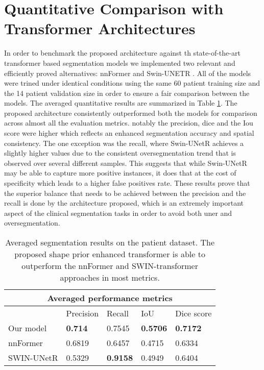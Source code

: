 \section{Quantitative Comparison with Transformer Architectures}
In order to benchmark the proposed architecture against th state-of-the-art transformer based segmentation models we implemented two relevant and efficiently proved alternatives: nnFormer \cite{zhou2023nnformer} and Swin-UNETR \cite{10.1007/978-3-031-08999-2_22}. All of the models were trined under identical conditions using the same 60 patient training size and the 14 patient validation size in order to ensure a fair comparison between the models. The averaged quantitative results are summarized in Table \ref{tab:quantitative_comparison}. The proposed architecture consistently outperformed both the models for comparison across almost all the evaluation metrics. notably the precision, dice and the Iou score were higher which reflects an enhanced segmentation accuracy and spatial consistency. The one exception was the recall, where Swin-UNetR achieves a slightly higher values due to the consistent oversegmentation trend that is observed over several different samples. This suggests that while Swin-UNetR may be able to capture more positive instances, it does that at the cost of specificity which leads to a higher false positives rate. These results prove that the superior balance that needs to be achieved between the precision and the recall is done by the architecture proposed, which is an extremely important aspect of the clinical segmentation tasks in order to avoid both uner and oversegmentation.

\begin{table}[h!]
    \begin{tabular}{ |p{2.3cm}|p{2.3cm}|p{2.3cm}|p{2.3cm}|p{2.3cm}|}
            \hline
            \multicolumn{5}{|c|}{Averaged performance metrics} \\
            \hline
             & Precision & Recall & IoU & Dice score \\
            \hline
            Our model & \textbf{0.714} & 0.7545 & \textbf{0.5706} & \textbf{0.7172} \\
            \hline
            nnFormer & 0.6819 & 0.6457 & 0.4715 & 0.6334 \\
            \hline
            SWIN-UNetR & 0.5329 & \textbf{0.9158} & 0.4949 & 0.6404 \\
            \hline
    \end{tabular}
    \caption{Averaged segmentation results on the patient dataset. The proposed shape prior enhanced transformer is able to outperform the nnFormer \cite{zhou2023nnformer} and SWIN-transformer \cite{10.1007/978-3-031-08999-2_22} approaches in most metrics.}
    \label{tab:quantitative_comparison}
  \end{table}


